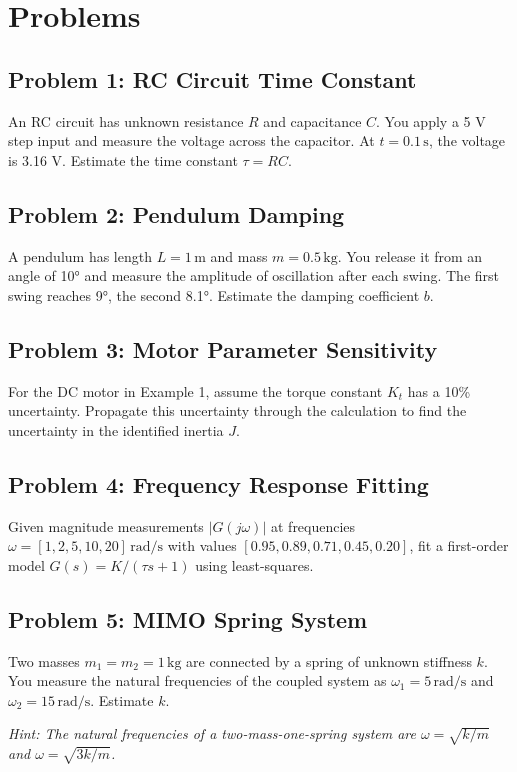 \section{Problems}

\subsection{Problem 1: RC Circuit Time Constant}

An RC circuit has unknown resistance $R$ and capacitance $C$. You apply a 5 V step input and measure the voltage across the capacitor. At $t = 0.1 \, \text{s}$, the voltage is 3.16 V. Estimate the time constant $\tau = RC$.

\subsection{Problem 2: Pendulum Damping}

A pendulum has length $L = 1 \, \text{m}$ and mass $m = 0.5 \, \text{kg}$. You release it from an angle of 10° and measure the amplitude of oscillation after each swing. The first swing reaches 9°, the second 8.1°. Estimate the damping coefficient $b$.

\subsection{Problem 3: Motor Parameter Sensitivity}

For the DC motor in Example 1, assume the torque constant $K_t$ has a 10\% uncertainty. Propagate this uncertainty through the calculation to find the uncertainty in the identified inertia $J$.

\subsection{Problem 4: Frequency Response Fitting}

Given magnitude measurements $|G(j\omega)|$ at frequencies $\omega = [1, 2, 5, 10, 20] \, \text{rad/s}$ with values $[0.95, 0.89, 0.71, 0.45, 0.20]$, fit a first-order model $G(s) = K/(\tau s + 1)$ using least-squares.

\subsection{Problem 5: MIMO Spring System}

Two masses $m_1 = m_2 = 1 \, \text{kg}$ are connected by a spring of unknown stiffness $k$. You measure the natural frequencies of the coupled system as $\omega_1 = 5 \, \text{rad/s}$ and $\omega_2 = 15 \, \text{rad/s}$. Estimate $k$.

\textit{Hint: The natural frequencies of a two-mass-one-spring system are $\omega = \sqrt{k/m}$ and $\omega = \sqrt{3k/m}$.}
